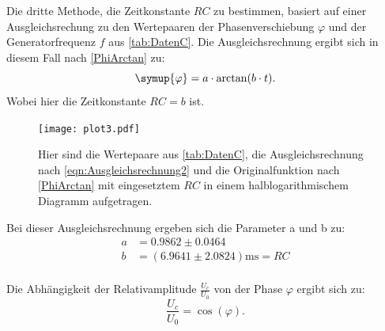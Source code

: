 Die dritte Methode, die Zeitkonstante $RC$ zu bestimmen, basiert auf einer Ausgleichsrechung zu den Wertepaaren der Phasenverschiebung $\varphi$ 
und der Generatorfrequenz $f$ aus \autoref{tab:DatenC}.
Die Ausgleichsrechnung ergibt sich in diesem Fall nach \eqref{PhiArctan} zu:
\begin{equation}
  \label{eqn:Ausgleichsrechnung2}
  \symup{\varphi} = a\cdot\arctan(b\cdot t).
\end{equation}
Wobei hier die Zeitkonstante $RC = b$ ist.
\begin{figure}[H]
  \centering
  \texttt{[image: plot3.pdf]}
  \caption{Hier sind die Wertepaare aus \autoref{tab:DatenC}, die Ausgleichsrechnung nach \eqref{eqn:Ausgleichsrechnung2} und die Originalfunktion nach \eqref{PhiArctan} mit eingesetztem $RC$ in einem halblogarithmischem Diagramm aufgetragen.}
  \label{fig:plot3}
\end{figure}
Bei dieser Ausgleichsrechnung ergeben sich die Parameter a und b zu:
\begin{align*}
  a &=0.9862\pm 0.0464 \\
  b &=(6.9641\pm 2.0824) \unit{\milli\second} = RC \\
\end{align*}

Die Abhängigkeit der Relativamplitude $\frac{U_c}{U_0}$ von der Phase $\varphi$ ergibt sich zu:
\begin{equation*}
  \frac{U_c}{U_0} = \cos\left(\varphi\right).
\end{equation*}

